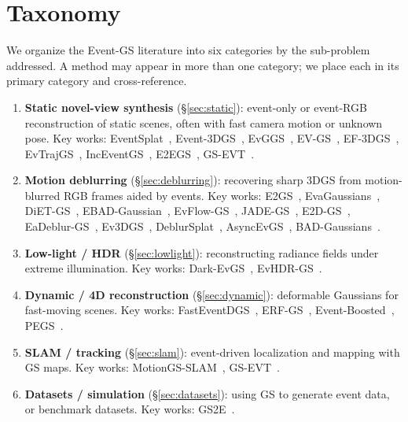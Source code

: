 \section{Taxonomy}
\label{sec:taxonomy}

We organize the Event-GS literature into six categories by the sub-problem addressed. A method may appear in more than one category; we place each in its primary category and cross-reference.

\begin{enumerate}
    \item[\textbf{A.}] \textbf{Static novel-view synthesis} (\S\ref{sec:static}): event-only or event-RGB reconstruction of static scenes, often with fast camera motion or unknown pose. Key works: EventSplat~\cite{yura2025eventsplat}, Event-3DGS~\cite{han2024event3dgs}, EvGGS~\cite{wang2024evggs}, EV-GS~\cite{wu2024evgs}, EF-3DGS~\cite{liao2025ef3dgs}, EvTrajGS~\cite{chen2026evtrajgs}, IncEventGS~\cite{huang2025inceventgs}, E2EGS~\cite{kim2026e2egs}, GS-EVT~\cite{liu2025gsevt}.
    \item[\textbf{B.}] \textbf{Motion deblurring} (\S\ref{sec:deblurring}): recovering sharp 3DGS from motion-blurred RGB frames aided by events. Key works: E2GS~\cite{deguchi2024e2gs}, EvaGaussians~\cite{yu2025evagaussians}, DiET-GS~\cite{lee2025dietgs}, EBAD-Gaussian~\cite{deng2025ebad}, EvFlow-GS~\cite{an2026evflow}, JADE-GS~\cite{fu2026jadegs}, E2D-GS~\cite{lin2025e2dgs}, EaDeblur-GS~\cite{weng2024eadeblur}, Ev3DGS~\cite{huang2024ev3dgs}, DeblurSplat~\cite{li2025deblursplat}, AsyncEvGS~\cite{dai2026asyncevgs}, BAD-Gaussians~\cite{zhao2024badgaussians}.
    \item[\textbf{C.}] \textbf{Low-light / HDR} (\S\ref{sec:lowlight}): reconstructing radiance fields under extreme illumination. Key works: Dark-EvGS~\cite{wu2025darkevgs}, EvHDR-GS~\cite{chen2026evhdrgs}.
    \item[\textbf{D.}] \textbf{Dynamic / 4D reconstruction} (\S\ref{sec:dynamic}): deformable Gaussians for fast-moving scenes. Key works: FastEventDGS~\cite{dai2026fasteventdgs}, ERF-GS~\cite{bai2026erfgs}, Event-Boosted~\cite{xu2025eventboosted}, PEGS~\cite{xu2025pegs}.
    \item[\textbf{E.}] \textbf{SLAM / tracking} (\S\ref{sec:slam}): event-driven localization and mapping with GS maps. Key works: MotionGS-SLAM~\cite{hu2026motiongs}, GS-EVT~\cite{liu2025gsevt}.
    \item[\textbf{F.}] \textbf{Datasets / simulation} (\S\ref{sec:datasets}): using GS to generate event data, or benchmark datasets. Key works: GS2E~\cite{li2025gs2e}.
\end{enumerate}

